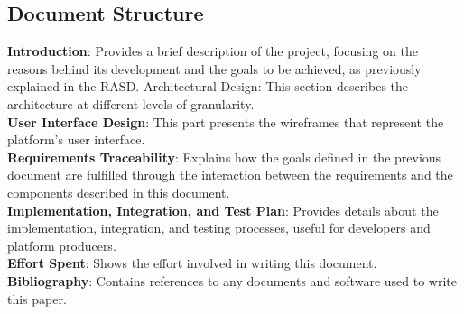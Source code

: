 \subsection{Document Structure}
\textbf{Introduction}: Provides a brief description of the project, focusing on the reasons behind its development and the goals to be achieved, as previously explained in the RASD.
Architectural Design: This section describes the architecture at different levels of granularity. \\
\textbf{User Interface Design}: This part presents the wireframes that represent the platform’s user interface. \\
\textbf{Requirements Traceability}: Explains how the goals defined in the previous document are fulfilled through the interaction between the requirements and the components described in this document. \\
\textbf{Implementation, Integration, and Test Plan}: Provides details about the implementation, integration, and testing processes, useful for developers and platform producers. \\
\textbf{Effort Spent}: Shows the effort involved in writing this document. \\
\textbf{Bibliography}: Contains references to any documents and software used to write this paper.